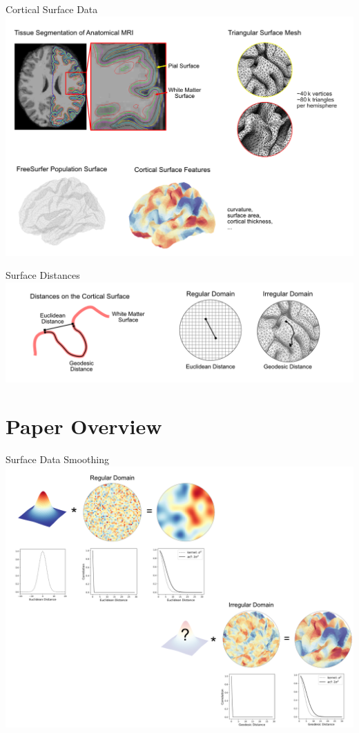 \documentclass[8pt]{beamer}
\begin{document}
\begin{frame}{Cortical Surface Data}
\includegraphics[width=1\textwidth]{project/figures/cortical-surface-data.png}    
\citep{dale_cortical_1999}
\end{frame}

\begin{frame}{Surface Distances}
\includegraphics[width=1\textwidth]{project/figures/surface-distances.png} 
\end{frame}

\section{Paper Overview}

\begin{frame}{Surface Data Smoothing}
\includegraphics[width=1\textwidth]{project/figures/surface-data-smoothing.png}   
\citep{chung_discrete_2018, kushnarev_heat_2019}
\end{frame}
\end{document}
